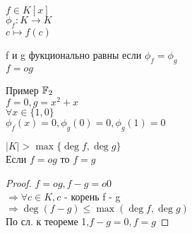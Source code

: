 $ f \in K[x]  $ \\
$ \phi_f : K \rightarrow K $ \\
$ c \mapsto f(c) $ \\
\begin{definition}
	f и g фукционально равны если $ \phi_f = \phi_g $ \\
	$ f =o g $ \\
\end{definition}
Пример $ \mathbb{F}_2 $ \\
$ f = 0, g = x^2 +x $ \\
$ \forall x \in \{1,0\} $ \\
$ \phi_f (x) = 0, \phi_g(0)= 0, \phi_g(1) = 0 $ \\
\begin{theorem}
	$ |K| > \max \{ \deg f, \deg g \} $ \\
	Если $ f =o g$ то $ f = g $
	\begin{proof}
		$ f =o g, f - g =o 0 $ \\
		$ \Rightarrow \forall c \in K, c $ - корень f - g \\
		$ \Rightarrow \deg (f-g) \leq \max ( \deg f, \deg g ) $ \\
		По сл. к теореме 1,$ f - g = 0, f = g $
	\end{proof}
\end{theorem}


















